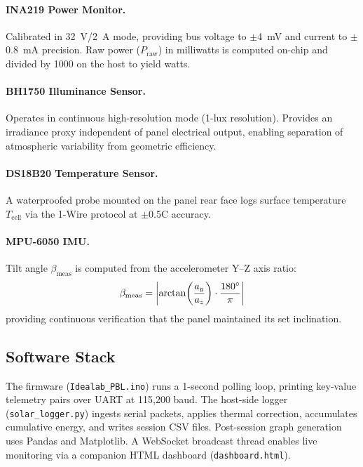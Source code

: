 \documentclass[conference]{IEEEtran}
\begin{document}
\paragraph{INA219 Power Monitor.}
Calibrated in 32~V/2~A mode, providing bus voltage to $\pm$4~mV and current to $\pm$0.8~mA
precision. Raw power ($P_{\text{raw}}$) in milliwatts is computed on-chip and divided by 1000
on the host to yield watts.

\paragraph{BH1750 Illuminance Sensor.}
Operates in continuous high-resolution mode (1-lux resolution). Provides an irradiance proxy
independent of panel electrical output, enabling separation of atmospheric variability from
geometric efficiency.

\paragraph{DS18B20 Temperature Sensor.}
A waterproofed probe mounted on the panel rear face logs surface temperature $T_{\text{cell}}$
via the 1-Wire protocol at $\pm$0.5\degree{}C accuracy.

\paragraph{MPU-6050 IMU.}
Tilt angle $\beta_{\text{meas}}$ is computed from the accelerometer Y--Z axis ratio:
\begin{equation}
  \beta_{\text{meas}} = \left|\arctan\!\left(\frac{a_y}{a_z}\right)
  \cdot \frac{180\degree{}}{\pi}\right|
  \label{eq:tilt}
\end{equation}
providing continuous verification that the panel maintained its set inclination.

\subsection{Software Stack}

The firmware (\texttt{Idealab\_PBL.ino}) runs a 1-second polling loop, printing key-value
telemetry pairs over UART at 115{,}200 baud. The host-side logger (\texttt{solar\_logger.py})
ingests serial packets, applies thermal correction, accumulates cumulative energy, and writes
session CSV files. Post-session graph generation uses Pandas and Matplotlib. A WebSocket
broadcast thread enables live monitoring via a companion HTML dashboard
(\texttt{dashboard.html}).
\end{document}
